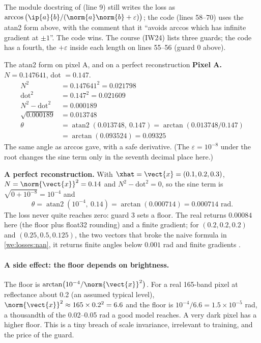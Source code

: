 \begin{sourcenote}
The module docstring of  (line 9) still
writes the loss as $\arccos\big(\ip{a}{b}/(\norm{a}\norm{b} + \varepsilon)\big)$; the code
(lines 58--70) uses the atan2 form above, with the comment that it ``avoids arccos which has
infinite gradient at $\pm 1$''. The code wins. The course (IW24) lists three guards; the code
has a fourth, the $+\varepsilon$ inside each length on lines 55--56 (guard 0 above).
\end{sourcenote}

\begin{worked}[label={we:losses:atan2}]{The atan2 form on pixel A, and on a perfect reconstruction}
\textbf{Pixel A.} $N = 0.147641$, dot $= 0.147$.
\begin{align*}
N^2 &= 0.147641^2 = 0.021798\\
\text{dot}^2 &= 0.147^2 = 0.021609\\
N^2 - \text{dot}^2 &= 0.000189\\
\sqrt{0.000189} &= 0.013748\\
\theta &= \operatorname{atan2}(0.013748,\ 0.147) = \arctan(0.013748/0.147)\\
&= \arctan(0.093524) = 0.09325
\end{align*}
The same angle as arccos gave, with a safe derivative. (The $\varepsilon = 10^{-8}$ under the
root changes the sine term only in the seventh decimal place here.)

\textbf{A perfect reconstruction.} With $\xhat = \vect{x} = (0.1, 0.2, 0.3)$, $N = \norm{\vect{x}}^2
= 0.14$ and $N^2 - \text{dot}^2 = 0$, so the sine term is $\sqrt{0 + 10^{-8}} = 10^{-4}$ and
\[
\theta = \operatorname{atan2}(10^{-4},\ 0.14) = \arctan(0.000714) = 0.000714 \text{ rad}.
\]
The loss never quite reaches zero: guard 3 sets a floor. The real  returns
$0.00084$ here \tagC{} (the floor plus float32 rounding) and a finite gradient; for
$(0.2,0.2,0.2)$ and $(0.25,0.5,0.125)$, the two vectors that broke the naive formula in
\cref{we:losses:nan}, it returns finite angles below $0.001$ rad and finite gradients \tagC.
\end{worked}

\paragraph{A side effect: the floor depends on brightness.} The floor is
$\arctan\!\big(10^{-4}/\norm{\vect{x}}^2\big)$. For a real 165-band pixel at reflectance about
0.2 \tagA{} (an assumed typical level), $\norm{\vect{x}}^2 \approx 165 \times 0.2^2 = 6.6$ and the
floor is $10^{-4}/6.6 = 1.5 \times 10^{-5}$ rad, a thousandth of the 0.02--0.05 rad a good model
reaches. A very dark pixel has a higher floor. This is a tiny breach of scale invariance,
irrelevant to training, and the price of the guard.

